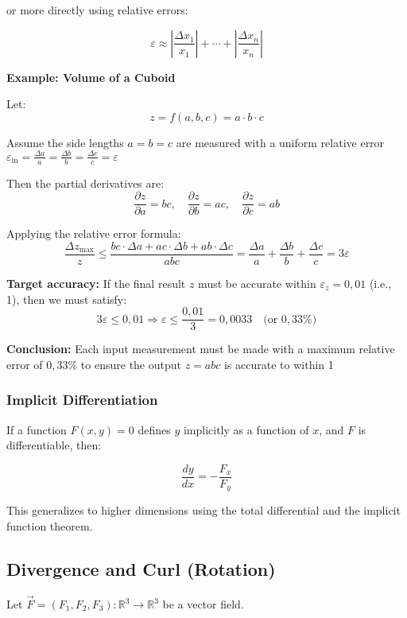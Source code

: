or more directly using relative errors:

\[
\varepsilon \approx \left| \frac{\Delta x_1}{x_1} \right| + \cdots + \left| \frac{\Delta x_n}{x_n} \right|
\]

\textbf{Example: Volume of a Cuboid}

Let:
\[
z = f(a, b, c) = a \cdot b \cdot c
\]

Assume the side lengths \( a = b = c \) are measured with a uniform relative error \( \varepsilon_{\text{in}} = \frac{\Delta a}{a} = \frac{\Delta b}{b} = \frac{\Delta c}{c} = \varepsilon \)

Then the partial derivatives are:
\[
\frac{\partial z}{\partial a} = b c, \quad
\frac{\partial z}{\partial b} = a c, \quad
\frac{\partial z}{\partial c} = a b
\]

Applying the relative error formula:
\[
\frac{\Delta z_{\max}}{z} \leq \frac{bc \cdot \Delta a + ac \cdot \Delta b + ab \cdot \Delta c}{abc}
= \frac{\Delta a}{a} + \frac{\Delta b}{b} + \frac{\Delta c}{c} = 3 \varepsilon
\]

\textbf{Target accuracy:}  
If the final result \( z \) must be accurate within \( \varepsilon_z = 0{,}01 \) (i.e., 1), then we must satisfy:
\[
3 \varepsilon \leq 0{,}01 \Rightarrow \varepsilon \leq \frac{0{,}01}{3} = \boxed{0{,}0033} \quad \text{(or } 0{,}33\% \text{)}
\]

\textbf{Conclusion:}  
Each input measurement must be made with a maximum relative error of \( \boxed{0{,}33\%} \) to ensure the output \( z = abc \) is accurate to within 1%

\subsubsection{Implicit Differentiation}

If a function \( F(x, y) = 0 \) defines \( y \) implicitly as a function of \( x \), and \( F \) is differentiable, then:

\[
\frac{dy}{dx} = -\frac{F_x}{F_y}
\]

This generalizes to higher dimensions using the total differential and the implicit function theorem.


\subsection{Divergence and Curl (Rotation)}

Let \( \vec{F} = (F_1, F_2, F_3) : \mathbb{R}^3 \to \mathbb{R}^3 \) be a vector field.

